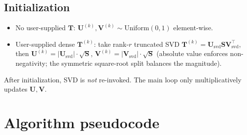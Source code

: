 \documentclass[11pt]{article}
\newcommand{\mat}[1]{\mathbf{#1}}
\begin{document}
\subsection*{Initialization}

\begin{itemize}[leftmargin=1.5em, itemsep=0.2em]
  \item No user-supplied $\mat{T}$: $\mat{U}^{(k)}, \mat{V}^{(k)} \sim \mathrm{Uniform}(0, 1)$ element-wise.
  \item User-supplied dense $\mat{T}^{(k)}$: take rank-$r$ truncated SVD $\mat{T}^{(k)} = \mat{U}_{\text{svd}} \mat{S} \mat{V}_{\text{svd}}^\top$, then
  $\mat{U}^{(k)} = | \mat{U}_{\text{svd}} | \cdot \sqrt{\mat{S}}$,
  $\mat{V}^{(k)} = | \mat{V}_{\text{svd}} | \cdot \sqrt{\mat{S}}$ (absolute value enforces non-negativity; the symmetric square-root split balances the magnitude).
\end{itemize}
After initialization, SVD is \emph{not} re-invoked. The main loop only multiplicatively updates $\mat{U}, \mat{V}$.

\section{Algorithm pseudocode}
\end{document}
